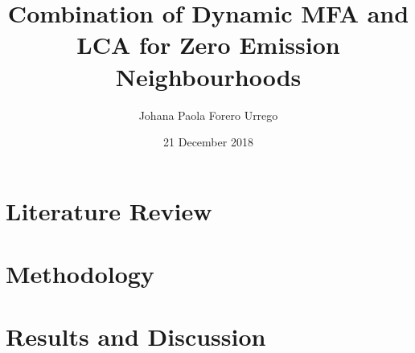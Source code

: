 \documentclass[a4paper,11pt]{report}
\title{Combination of Dynamic MFA and LCA for Zero Emission Neighbourhoods}
\author{Johana Paola Forero Urrego}
\date{21 December 2018}
\begin{document}
\maketitle

\tableofcontents


\chapter{Literature Review}


\chapter{Methodology}



\chapter{Results and Discussion}



\end{document}
